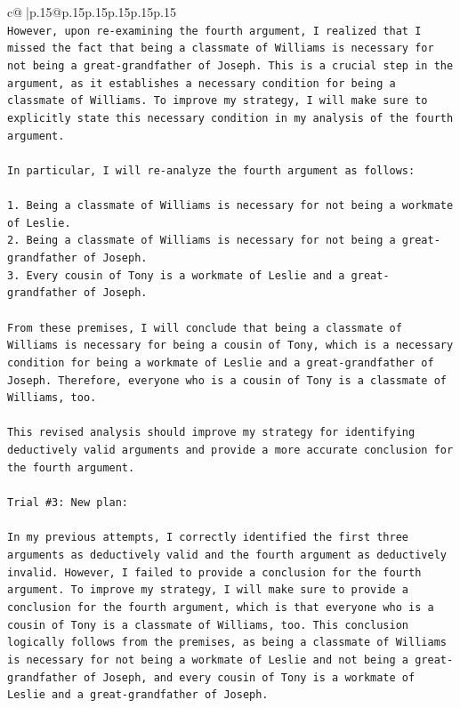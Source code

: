 \documentclass{article}
\begin{document}
{\begin{supertabular}{c@{$\;$}|p{.15\linewidth}@{}p{.15\linewidth}p{.15\linewidth}p{.15\linewidth}p{.15\linewidth}p{.15\linewidth}}
{{{\\ 
\texttt{However, upon re{-}examining the fourth argument, I realized that I missed the fact that being a classmate of Williams is necessary for not being a great{-}grandfather of Joseph. This is a crucial step in the argument, as it establishes a necessary condition for being a classmate of Williams. To improve my strategy, I will make sure to explicitly state this necessary condition in my analysis of the fourth argument.} \\
\\ 
\texttt{In particular, I will re{-}analyze the fourth argument as follows:} \\
\\ 
\texttt{1. Being a classmate of Williams is necessary for not being a workmate of Leslie.} \\
\texttt{2. Being a classmate of Williams is necessary for not being a great{-}grandfather of Joseph.} \\
\texttt{3. Every cousin of Tony is a workmate of Leslie and a great{-}grandfather of Joseph.} \\
\\ 
\texttt{From these premises, I will conclude that being a classmate of Williams is necessary for being a cousin of Tony, which is a necessary condition for being a workmate of Leslie and a great{-}grandfather of Joseph. Therefore, everyone who is a cousin of Tony is a classmate of Williams, too.} \\
\\ 
\texttt{This revised analysis should improve my strategy for identifying deductively valid arguments and provide a more accurate conclusion for the fourth argument.} \\
\\ 
\texttt{Trial \#3: New plan: } \\
\\ 
\texttt{In my previous attempts, I correctly identified the first three arguments as deductively valid and the fourth argument as deductively invalid. However, I failed to provide a conclusion for the fourth argument. To improve my strategy, I will make sure to provide a conclusion for the fourth argument, which is that everyone who is a cousin of Tony is a classmate of Williams, too. This conclusion logically follows from the premises, as being a classmate of Williams is necessary for not being a workmate of Leslie and not being a great{-}grandfather of Joseph, and every cousin of Tony is a workmate of Leslie and a great{-}grandfather of Joseph.} \\
}}}
\end{supertabular}}
\end{document}
